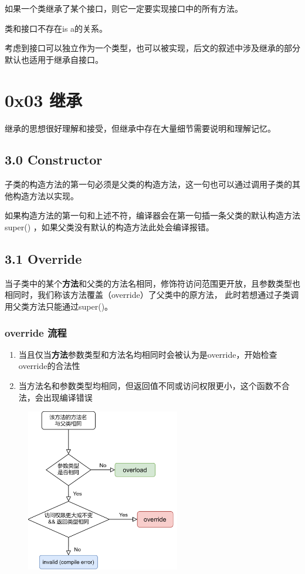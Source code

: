 如果一个类继承了某个接口，则它一定要实现接口中的所有方法。

类和接口不存在is a的关系。

考虑到接口可以独立作为一个类型，也可以被实现，后文的叙述中涉及继承的部分默认也适用于继承自接口。

\section{0x03 继承}

继承的思想很好理解和接受，但继承中存在大量细节需要说明和理解记忆。

\subsection{3.0 Constructor}

子类的构造方法的第一句必须是父类的构造方法，这一句也可以通过调用子类的其他构造方法以实现。

如果构造方法的第一句和上述不符，编译器会在第一句插一条父类的默认构造方法 super() ，如果父类没有默认的构造方法此处会编译报错。

\subsection{3.1 Override}

当子类中的某个\textbf{方法}和父类的方法名相同，修饰符访问范围更开放，且参数类型也相同时，我们称该方法覆盖（override）了父类中的原方法，
此时若想通过子类调用父类方法只能通过super()。

\subsubsection{override 流程}
\begin{enumerate}
    \item 当且仅当\textbf{方法}参数类型和方法名均相同时会被认为是override，开始检查override的合法性
    \item 当方法名和参数类型均相同，但返回值不同或访问权限更小，这个函数不合法，会出现编译错误
\end{enumerate}

\begin{figure}[H]
    \centering
    \includegraphics[width = 0.6\textwidth]{../pic/4/flowchart_override.png}
\end{figure}

